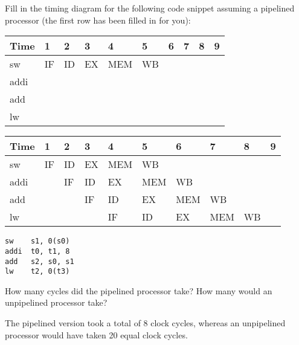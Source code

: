 \begin{blocksection}
\question Fill in the timing diagram for the following code snippet assuming a pipelined processor (the first row has been filled in for you):

\begin{tabular}{ |l|l|l|l|l|l|l|l|l|l| } 
 \hline
 Time & 1 & 2 & 3 & 4 & 5 & 6 & 7 & 8 & 9 \\
 \hline
 sw & IF & ID & EX & MEM & WB & & & & \\
 \hline
 addi & & & & & & & & & \\
 \hline
 add & & & & & & & & & \\
 \hline
 lw & & & & & & & & & \\
 \hline
\end{tabular}

\begin{solution}
\begin{tabular}{ |l|l|l|l|l|l|l|l|l|l| } 
 \hline
 Time & 1 & 2 & 3 & 4 & 5 & 6 & 7 & 8 & 9 \\
 \hline
 sw & IF & ID & EX & MEM & WB & & & & \\
 \hline
 addi & & IF & ID & EX & MEM & WB & & & \\
 \hline
 add & & & IF & ID & EX & MEM & WB & & \\
 \hline
 lw & & & & IF & ID & EX & MEM & WB & \\
 \hline
\end{tabular}
\end{solution}

\begin{verbatim}
sw	  s1, 0(s0)
addi  t0, t1, 8
add   s2, s0, s1
lw	  t2, 0(t3)
\end{verbatim}

How many cycles did the pipelined processor take? How many would an unpipelined processor take?

\begin{solution}[0.5in]
The pipelined version took a total of 8 clock cycles, whereas an unpipelined processor would have taken 20 equal clock cycles.
\end{solution}
\end{blocksection}